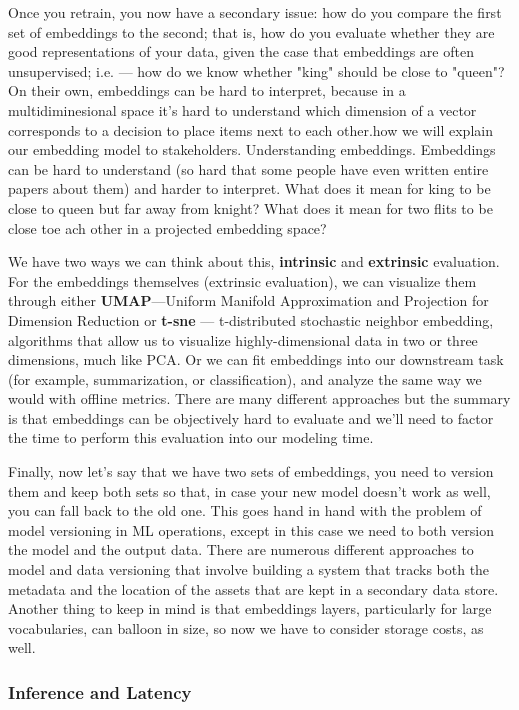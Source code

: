\documentclass[11pt, table]{diazessay} %
\begin{document}
\begin{sloppypar}
Once you retrain, you now have a secondary issue: how do you compare the first set of embeddings to the second; that is, how do you evaluate whether they are good representations of your data, given the case that embeddings are often unsupervised; i.e. --- how do we know whether "king" should be close to "queen"? On their own, embeddings can be hard to interpret, because in a multidiminesional space it's hard to understand which dimension of a vector corresponds to a decision to place items next to each other\citep{simhi2022interpreting}.how we will explain our embedding model to stakeholders. Understanding embeddings. Embeddings can be hard to understand (so hard that some people have even written entire papers about them) and harder to interpret. What does it mean for king to be close to queen but far away from knight? What does it mean for two flits to be close toe ach other in a projected embedding space?  

We have two ways we can think about this, \textbf{intrinsic} and \textbf{extrinsic} evaluation. For the embeddings themselves (extrinsic evaluation), we can visualize them through either \textbf{UMAP}---Uniform Manifold Approximation and Projection for Dimension Reduction or \textbf{t-sne} --- t-distributed stochastic neighbor embedding, algorithms that allow us to visualize highly-dimensional data in two or three dimensions, much like PCA. Or we can fit embeddings into our downstream task (for example, summarization, or classification), and analyze the same way we would with offline metrics. There are many different approaches
\citep{wang2019evaluating} but the summary is that embeddings can be objectively hard to evaluate and we'll need to factor the time to perform this evaluation into our modeling time. 

Finally, now let's say that we have two sets of embeddings, you need to version them and keep both sets so that, in case your new model doesn't work as well, you can fall back to the old one. This goes hand in hand with the problem of model versioning in ML operations, except in this case we need to both version the model and the output data. There are numerous different approaches to model and data versioning that involve building a system that tracks both the metadata and the location of the assets that are kept in a secondary data store. Another thing to keep in mind is that embeddings layers, particularly for large vocabularies, can balloon in size, so now we have to consider storage costs, as well. 


\subsubsection{Inference and Latency}


\end{sloppypar}
\end{document}
